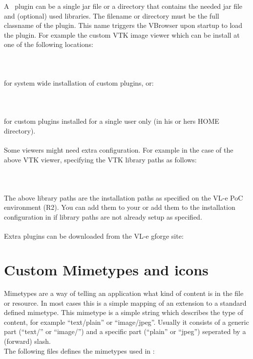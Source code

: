 A \vbrowser\ plugin can be a single jar file or a directory that contains the needed
jar file and (optional) used libraries. The filename or directory must 
be the full classname of the plugin. 
This name triggers the VBrowser upon startup to load the plugin. 
For example the custom VTK image viewer which can be install at one of the
following locations:\\
\\
\tab {}\\
\\	
for system wide installation of custom plugins, or:\\
\\
\tab {}\\
\\
for custom plugins installed for a single user only (in his or hers HOME directory). \\
\\
Some viewers might need extra configuration. For example in the case of
the above VTK viewer, specifying the VTK library paths as follows:\\
\\
\tab {}\\
\\
The above library paths are the installation paths as specified on the VL-e PoC
environment (R2). You can add them to your  or add them to the
installation configuration in  if library
paths are not already setup as specified. \\
\\
Extra plugins can be downloaded from the VL-e gforge 
site: 

\section{Custom Mimetypes and icons}

Mimetypes are a way of telling an application what kind of content is in the
file or resource. In most cases this is a simple mapping of an extension to a 
standard defined mimetype. This mimetype is a simple string which describes 
the type of content, for example ``text/plain'' or ``image/jpeg''. Usually it
consists of a generic part (``text/'' or ``image/'') and a specific part
(``plain'' or ``jpeg'') seperated by a (forward) slash.\\ 
The following files defines the mimetypes used in \VLET:

